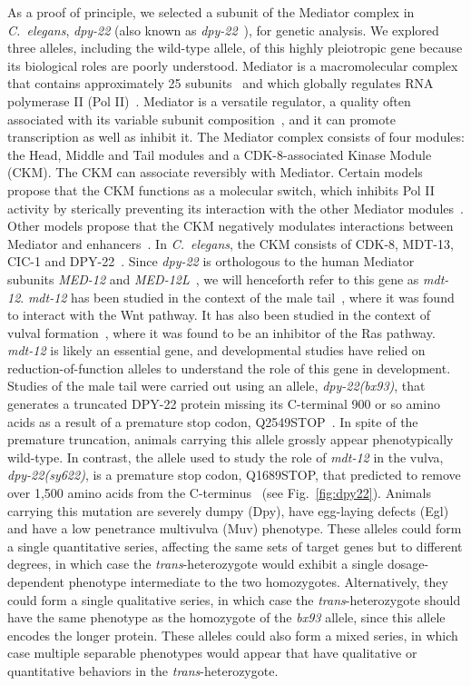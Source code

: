 \documentclass[10pt, twocolumn]{article}
\newcommand{\cel}{\emph{C.~elegans}}
\newcommand{\gene}[1]{\mbox{\emph{#1}}}
\newcommand{\protein}[1]{\mbox{\uppercase{#1}}}
\newcommand{\dpy}{\gene{mdt-12}}
\begin{document}
As a proof of principle, we selected a subunit of the Mediator complex in
\cel{}, \gene{dpy-22} (also known as \gene{dpy-22}~\cite{}), for genetic analysis.
We explored three alleles, including the wild-type allele, of this highly
pleiotropic gene because its biological roles are poorly understood. Mediator is
a macromolecular complex that contains approximately 25
subunits~\cite{Jeronimo2017} and which globally regulates RNA polymerase II (Pol
II)~\cite{Allen2015,Takagi2006}. Mediator is a versatile regulator, a quality
often associated with its variable subunit composition~\cite{Allen2015}, and it
can promote transcription as well as inhibit it. The Mediator complex consists
of four modules: the Head, Middle and Tail modules and a CDK-8-associated Kinase
Module (CKM). The CKM can associate reversibly with Mediator. Certain models
propose that the CKM functions as a molecular switch, which inhibits Pol II
activity by sterically preventing its interaction with the other Mediator
modules~\cite{Knuesel2009,Elmlund2006}. Other models propose that the CKM
negatively modulates interactions between Mediator and
enhancers~\cite{VandePeppel2005}. In \cel{}, the CKM consists of
\protein{cdk-8}, \protein{mdt-13}, \protein{cic-1} and
\protein{DPY-22}~\cite{Grants2015}. Since \gene{dpy-22} is orthologous to the
human Mediator subunits \gene{MED-12} and \gene{MED-12L}~\cite{Zhang2000}, we
will henceforth refer to this gene as \dpy{}. \dpy{} has been studied in the
context of the male tail~\cite{Zhang2000}, where it was found to interact with
the Wnt pathway. It has also been studied in the context of vulval
formation~\cite{Moghal2003a}, where it was found to be an inhibitor of the Ras
pathway. \dpy{} is likely an essential gene, and developmental studies have
relied on reduction-of-function alleles to understand the role of this gene in
development. Studies of the male tail were carried out using an allele,
\gene{dpy-22(bx93)}, that generates a truncated \protein{dpy-22} protein missing
its C-terminal 900 or so amino acids as a result of a premature stop codon,
Q2549STOP~\cite{Zhang2000}. In spite of the premature truncation, animals
carrying this allele grossly appear phenotypically wild-type. In contrast, the
allele used to study the role of \dpy{} in the vulva, \gene{dpy-22(sy622)}, is a
premature stop codon, Q1689STOP, that predicted to remove over 1,500 amino acids
from the C-terminus~\cite{Moghal2003} (see Fig.~\ref{fig:dpy22}). Animals
carrying this mutation are severely dumpy (Dpy), have egg-laying defects (Egl)
and have a low penetrance multivulva (Muv) phenotype. These alleles could form a
single quantitative series, affecting the
same sets of target genes but to different degrees, in which case the
\emph{trans}-heterozygote would exhibit a single dosage-dependent phenotype
intermediate to the two homozygotes. Alternatively, they could form a single
qualitative series, in which case the \emph{trans}-heterozygote should have the
same phenotype as the homozygote of the \emph{bx93} allele, since this allele
encodes the longer protein. These alleles could also form a mixed series, in
which case multiple separable phenotypes would appear that have qualitative or
quantitative behaviors in the \emph{trans}-heterozygote.
\end{document}
